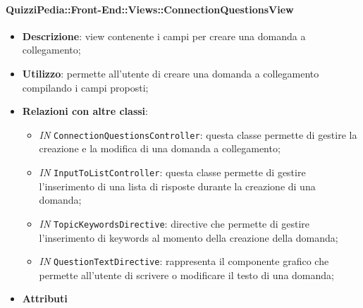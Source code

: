 \paragraph{QuizziPedia::Front-End::Views::ConnectionQuestionsView}
\begin{itemize}
	\item \textbf{Descrizione}: view contenente i campi per creare una domanda a collegamento;
	\item \textbf{Utilizzo}: permette all'utente di creare una domanda a collegamento compilando i campi proposti;
	\item \textbf{Relazioni con altre classi}:
	\begin{itemize}
		\item \textit{IN} \texttt{ConnectionQuestionsController}: questa classe permette di gestire la creazione e la modifica di una domanda a collegamento;
		\item \textit{IN} \texttt{InputToListController}: questa classe permette di gestire l'inserimento di una lista di risposte durante la creazione di una domanda;
		\item \textit{IN} \texttt{TopicKeywordsDirective}: directive che permette di gestire l'inserimento di keywords al momento della creazione della domanda;
		\item \textit{IN} \texttt{QuestionTextDirective}: rappresenta il componente grafico che permette all'utente di scrivere o modificare il testo di una domanda;
	\end{itemize}
	\item \textbf{Attributi}
\end{itemize}

